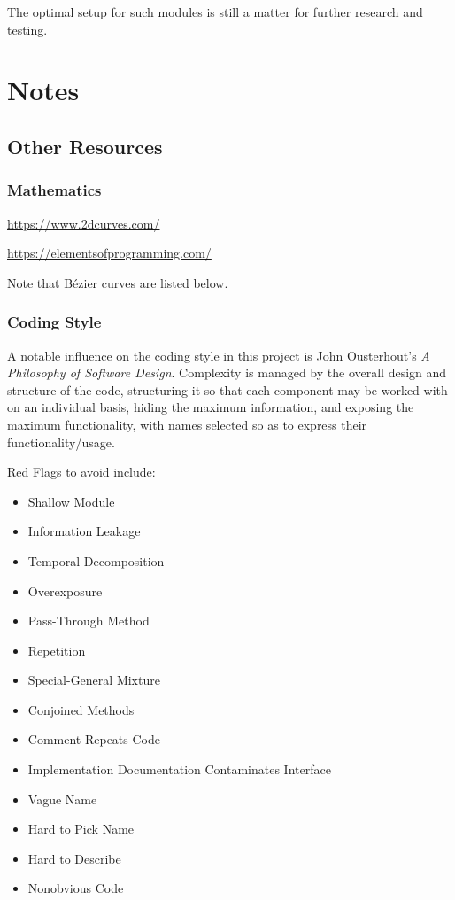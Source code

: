 \documentclass{ltxdoc}
\begin{document}
The optimal setup for such modules is still a matter for further research and testing.

\section{Notes}

\subsection{Other Resources}

\subsubsection{Mathematics}

\url{https://www.2dcurves.com/}

\noindent \url{https://elementsofprogramming.com/}

\noindent Note that Bézier curves are listed below.

\subsubsection{Coding Style}

A notable influence on the coding style in this project is John Ousterhout's \emph{A Philosophy of Software Design}\cite{Ousterhout2018APO}. Complexity is managed by the overall design and structure of the code, structuring it so that each component may be worked with on an individual basis, hiding the maximum information, and exposing the maximum functionality, with names selected so as to express their functionality/usage.

Red Flags to avoid include:

\begin{itemize}
\item Shallow Module
\item Information Leakage
\item Temporal Decomposition 
\item Overexposure
\item Pass-Through Method
\item Repetition
\item Special-General Mixture
\item Conjoined Methods
\item Comment Repeats Code
\item Implementation Documentation Contaminates Interface
\item Vague Name
\item Hard to Pick Name
\item Hard to Describe
\item Nonobvious Code
\end{itemize}
\end{document}
